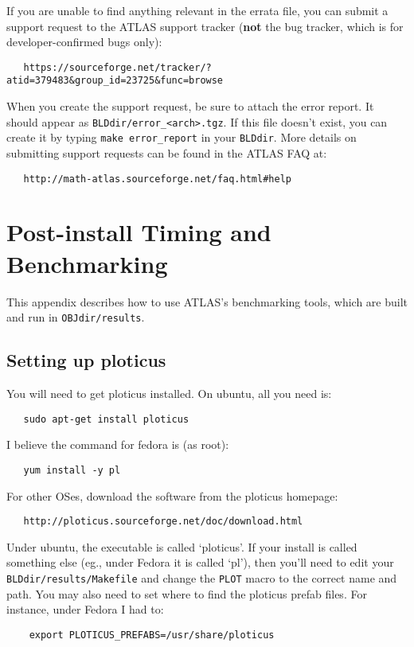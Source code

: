 \documentclass[11pt]{article}
\begin{document}
If you are unable to find anything relevant in the errata file, you can
submit a support request to the ATLAS support tracker ({\bf not} the
bug tracker, which is for developer-confirmed bugs only):
\vspace*{-0.1in}
\begin{verbatim}
   https://sourceforge.net/tracker/?atid=379483&group_id=23725&func=browse
\end{verbatim}

When you create the support request, be sure to attach the error report.
It should appear as \verb|BLDdir/error_<arch>.tgz|.  If this file doesn't
exist, you can create it by typing \verb|make error_report| in your
{\tt BLDdir}.  More details on submitting support requests can be found
in the ATLAS FAQ at:
\vspace*{-0.1in}
\begin{verbatim}
   http://math-atlas.sourceforge.net/faq.html#help
\end{verbatim}





\newpage
\appendix

\section{Post-install Timing and Benchmarking}
\label{sec-full-timing}

This appendix describes how to use ATLAS's benchmarking tools, which are
built and run in {\tt OBJdir/results}.

\subsection{Setting up ploticus}
You will need to get ploticus installed.  On ubuntu, all you need is:
\begin{verbatim}
   sudo apt-get install ploticus
\end{verbatim}

I believe the command for fedora is (as root):
\begin{verbatim}
   yum install -y pl
\end{verbatim}

For other OSes, download the software from the ploticus homepage:
\begin{verbatim}
   http://ploticus.sourceforge.net/doc/download.html
\end{verbatim}

Under ubuntu, the executable is called `ploticus'.  If your install
is called something else (eg., under Fedora it is called `pl'), then
you'll need to edit your {\tt BLDdir/results/Makefile} and change the
{\tt PLOT} macro to the correct name and path.  You may also need
to set where to find the ploticus prefab files.  For instance, under
Fedora I had to:
\begin{verbatim}
    export PLOTICUS_PREFABS=/usr/share/ploticus
\end{verbatim}
\end{document}
